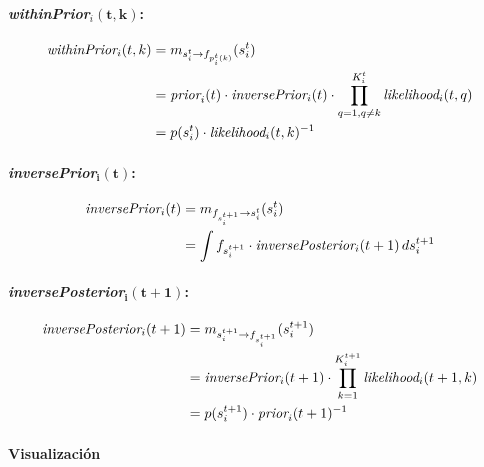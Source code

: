 \documentclass[11pt,twoside, spanish]{report} %
\begin{document}
\paragraph{\emph{withinPrior}$_i\bm{(t,k)}$:}


\begin{equation}
\begin{split}
\emph{withinPrior}_i(t,k) &= m_{s_i^t \rightarrow f_{p_i^t(k)}}(s_i^t)  \\
&= \emph{prior}_i(t) \cdot \emph{inversePrior}_i(t) \cdot \prod_{q=1, q\neq k}^{K_i^t} \emph{likelihood}_i(t,q) \\
&= p(s_i^t) \cdot \emph{likelihood}_i(t,k)^{-1}
\end{split}
\end{equation}

\paragraph{\emph{inversePrior}$\bm{_i(t)}$: }

\begin{equation}
\begin{split}
\emph{inversePrior}_i(t) &= m_{f_{s_i^{t+1}} \rightarrow s_i^t}(s_i^t) \\
&= \int f_{s_i^{t+1}} \cdot \emph{inversePosterior}_i(t+1) \, ds_i^{t+1}
\end{split}
\end{equation}

\paragraph{\emph{inversePosterior}$\bm{_i(t+1)}$: }

\begin{equation}
\begin{split}
\emph{inversePosterior}_i(t+1) &= m_{s_i^{t+1} \rightarrow f_{s_i^{t+1}}}(s_i^{t+1}) \\
&= \emph{inversePrior}_i(t+1) \cdot \prod_{k=1}^{K_i^{t+1}} \emph{likelihood}_i(t+1,k) \\
&= p(s_i^{t+1}) \cdot \emph{prior}_i(t+1)^{-1}
\end{split}
\end{equation}





\paragraph{Visualizaci\'on}
\end{document}
